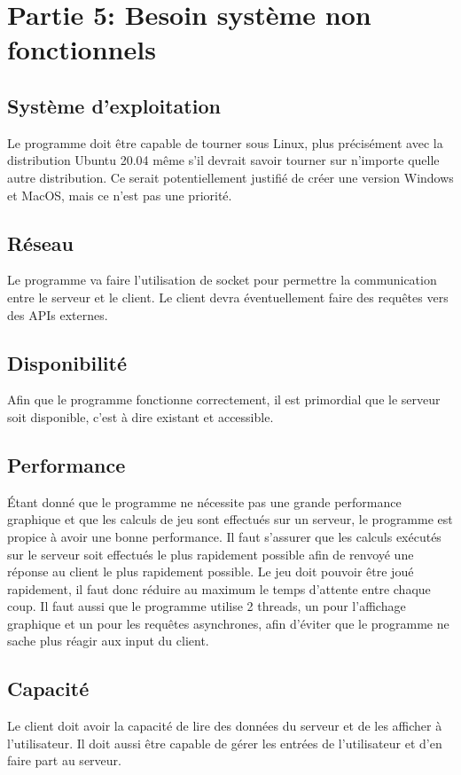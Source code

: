 \section{Partie 5: Besoin système non fonctionnels}
\subsection{Système d'exploitation}
Le programme doit être capable de tourner sous Linux, plus précisément avec la distribution Ubuntu 20.04 même s'il devrait savoir tourner
sur n'importe quelle autre distribution.
Ce serait potentiellement justifié de créer une version Windows et MacOS, mais ce n'est pas une priorité.

\subsection{Réseau}
Le programme va faire l'utilisation de socket pour permettre la communication entre le serveur et le client. 
Le client devra éventuellement faire des requêtes vers des APIs externes.

\subsection{Disponibilité}
Afin que le programme fonctionne correctement, il est primordial que le serveur soit disponible, c'est à dire existant et accessible. 

\subsection{Performance}
Étant donné que le programme ne nécessite pas une grande performance graphique et que les calculs de jeu sont effectués sur un serveur, le
programme est propice à avoir une bonne performance. Il faut s'assurer que les calculs exécutés sur le serveur soit effectués le plus
rapidement possible afin de renvoyé une réponse au client le plus rapidement possible. Le jeu doit pouvoir être joué rapidement, il faut
donc réduire au maximum le temps d'attente entre chaque coup.
Il faut aussi que le programme utilise 2 threads, un pour l'affichage graphique et un pour les requêtes asynchrones, afin d'éviter que le
programme ne sache plus réagir aux input du client.

\subsection{Capacité}
Le client doit avoir la capacité de lire des données du serveur et de les afficher à l'utilisateur. Il doit aussi être capable de gérer les
entrées de l'utilisateur et d'en faire part au serveur.

